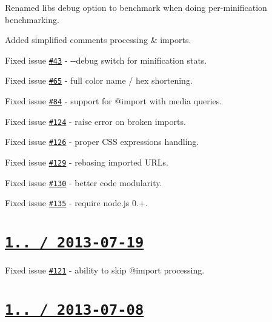\begin{DoxyItemize}
\item Renamed lib\textquotesingle{}s {\ttfamily debug} option to {\ttfamily benchmark} when doing per-\/minification benchmarking.
\item Added simplified comments processing \& imports.
\item Fixed issue \href{https://github.com/jakubpawlowicz/clean-css/issues/43}{\tt \#43} -\/ {\ttfamily -\/-\/debug} switch for minification stats.
\item Fixed issue \href{https://github.com/jakubpawlowicz/clean-css/issues/65}{\tt \#65} -\/ full color name / hex shortening.
\item Fixed issue \href{https://github.com/jakubpawlowicz/clean-css/issues/84}{\tt \#84} -\/ support for {\ttfamily @import} with media queries.
\item Fixed issue \href{https://github.com/jakubpawlowicz/clean-css/issues/124}{\tt \#124} -\/ raise error on broken imports.
\item Fixed issue \href{https://github.com/jakubpawlowicz/clean-css/issues/126}{\tt \#126} -\/ proper C\+SS expressions handling.
\item Fixed issue \href{https://github.com/jakubpawlowicz/clean-css/issues/129}{\tt \#129} -\/ rebasing imported U\+R\+Ls.
\item Fixed issue \href{https://github.com/jakubpawlowicz/clean-css/issues/130}{\tt \#130} -\/ better code modularity.
\item Fixed issue \href{https://github.com/jakubpawlowicz/clean-css/issues/135}{\tt \#135} -\/ require node.\+js 0.+.
\end{DoxyItemize}

\section*{\href{https://github.com/jakubpawlowicz/clean-css/compare/v1.0.11...v1.0.12}{\tt 1.. / 2013-\/07-\/19} }


\begin{DoxyItemize}
\item Fixed issue \href{https://github.com/jakubpawlowicz/clean-css/issues/121}{\tt \#121} -\/ ability to skip {\ttfamily @import} processing.
\end{DoxyItemize}

\section*{\href{https://github.com/jakubpawlowicz/clean-css/compare/v1.0.10...v1.0.11}{\tt 1.. / 2013-\/07-\/08} }


